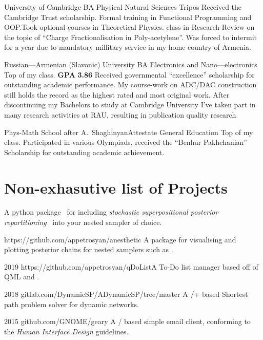 \documentclass{CurriculumVitae}[10pt, draft, condensed]
\begin{document}
{ {University of Cambridge} {BA }{Physical Natural
  Sciences Tripos} {Received the Cambridge Trust scholarship. Formal
  training in Functional Programming and OOP.\@ Took optional courses
  in Theoretical Physics.  class in Research Review on the
  topic of ``Charge Fractionalisation in Poly-acetylene''. Was forced to
  intermit for a year due to mandatory millitary service in my home country of
  Armenia. }


 {Russian---Armenian (Slavonic) University} {BA
  }{Electronics and Nano---electronics} {Top of my
  class. \textbf{GPA} \textbf{3.86} Received governmental
  ``excellence'' scholarship for outstanding academic performance. My
  course-work on ADC/DAC construction still holds the record as the
  highest rated and most original work. After discontinuing my
  Bachelors to study at Cambridge University I've taken part in many
  research activities at RAU, resulting in publication quality
  research~\cite{cu2o,measurement}}

 {Phys-Math School after
  A.~Shaghinyan}{Attestate }{General Education} {Top of my
  class. Participated in various Olympiads, received the ``Benhur
  Pakhchanian'' Scholarship for outstanding academic achievement. }

\section*{Non-exhasutive list of Projects}

 {A
  python package~\cite{sspr-joss} for including \emph{stochastic
    superpositional posterior repartitioning}~\cite{sspr} into your
  nested sampler of choice.}

 {https://github.com/appetrosyan/anesthetic}
{A package for visualising and plotting posterior chains for nested
  samplers such as .}

 {2019} {https://github.com/appetrosyan/qDoList}{A
  To-Do list manager based off of QML and .}

 {2018}
{gitlab.com/DynamicSP/ADynamicSP/tree/master} {A
  /+ based Shortest path problem solver for
  dynamic networks. }

 {2015} {github.com/GNOME/geary} {A
  / based simple email client, conforming to the
   \emph{Human Interface Design} guidelines.}

}
\end{document}
